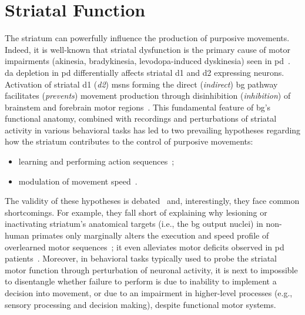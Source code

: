\section{Striatal Function}
\label{ch:disscusion:lesion}

The striatum can powerfully influence the production of purposive movements.
Indeed, it is well-known that striatal dysfunction is the primary cause of motor impairments (akinesia, bradykinesia, levodopa-induced dyskinesia) seen in \gls{pd}~\cite{Mink1996,Hornykiewicz2006,McGregor2019Neuron}.
\Gls{da} depletion in \gls{pd} differentially affects striatal \gls{d1} and \gls{d2} expressing neurons.
Activation of striatal \gls{d1} (\textit{\gls{d2}}) \glspl{msn} forming the direct (\textit{indirect}) \gls{bg} pathway facilitates (\textit{prevents}) movement production through disinhibition (\textit{inhibition}) of brainstem and forebrain motor regions~\cite{Kravitz2010Nature}.
This fundamental feature of \gls{bg}'s functional anatomy, combined with recordings and perturbations of striatal activity in various behavioral tasks has led to two prevailing hypotheses regarding how the striatum contributes to the control of purposive movements: %
\begin{itemize}[noitemsep]
    \item learning and performing action sequences\footnotemark~\cite{Barnes2005Nature, Jin2010N, Cui2013Nature, Klaus2017Neuron, Markowitz2018Cell};
    \item  modulation of movement speed~\cite{Kim2014EJN, Rueda2015NN, Barbera2016Neuron, Yttri2016Nature, Panigrahi2015Cell}.
\end{itemize}
The validity of these hypotheses is debated~\cite[for instance, see][]{Dudman2016CurrOpinNeurobiol} and, interestingly, they face common shortcomings.
For example, they fall short of explaining why lesioning or inactivating striatum's anatomical targets (i.e., the \gls{bg} output nuclei) in non-human primates only marginally alters the execution and speed profile of overlearned motor sequences~\cite{Desmurget2010JNeurosci}; it even alleviates motor deficits observed in \gls{pd} patients~\cite{Turner2010CurrOpinNeurobiol}.
Moreover, in behavioral tasks typically used to probe the striatal motor function through perturbation of neuronal activity, it is next to impossible to disentangle whether failure to perform is due to inability to implement a decision into movement, or due to an impairment in higher-level processes (e.g., sensory processing and decision making), despite functional motor systems.\footnotemark
